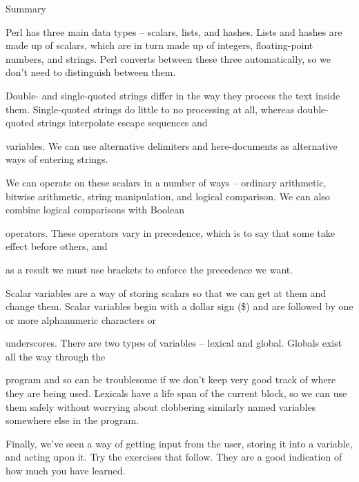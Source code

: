 \documentclass[a4paper,11pt]{book}
\begin{document}
\noindent 

\noindent 

\noindent Summary

\noindent 

\noindent Perl has three main data types -- scalars, lists, and hashes. Lists and hashes are made up of scalars, which are in turn made up of integers, floating-point numbers, and strings. Perl converts between these three automatically, so we don't need to distinguish between them.

\noindent 

\noindent Double- and single-quoted strings differ in the way they process the text inside them. Single-quoted strings do little to no processing at all, whereas double-quoted strings interpolate escape sequences and

\noindent variables. We can use alternative delimiters and here-documents as alternative ways of entering strings.

\noindent 

\noindent We can operate on these scalars in a number of ways -- ordinary arithmetic, bitwise arithmetic, string manipulation, and logical comparison. We can also combine logical comparisons with Boolean

\noindent operators. These operators vary in precedence, which is to say that some take effect before others, and

\noindent as a result we must use brackets to enforce the precedence we want.

\noindent 

\noindent Scalar variables are a way of storing scalars so that we can get at them and change them. Scalar variables begin with a dollar sign (\$) and are followed by one or more alphanumeric characters or

\noindent underscores. There are two types of variables -- lexical and global. Globals exist all the way through the

\noindent program and so can be troublesome if we don't keep very good track of where they are being used. Lexicals have a life span of the current block, so we can use them safely without worrying about clobbering similarly named variables somewhere else in the program.

\noindent 

\noindent Finally, we've seen a way of getting input from the user, storing it into a variable, and acting upon it. Try the exercises that follow. They are a good indication of how much you have learned.
\end{document}
